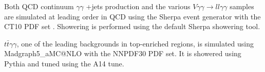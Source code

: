 Both QCD continuum $\gamma\gamma$ +jets production and the various $V\gamma\gamma \rightarrow ll\gamma\gamma$ samples are simulated at leading order in QCD using the Sherpa event generator with the CT10 PDF set \cite{CT10}. Showering is performed using the default Sherpa showering tool. 

$t\bar{t}\gamma\gamma$, one of the leading backgrounds in top-enriched regions, is simulated using 
Madgraph5\_aMC@NLO with the NNPDF30 PDF set. It is showered using Pythia and tuned using the A14 tune.


\begin{table}[h!]
  \centering
\caption{Summary of nominal background samples}
\label{tab:bckg_samples}
\end{table}  


